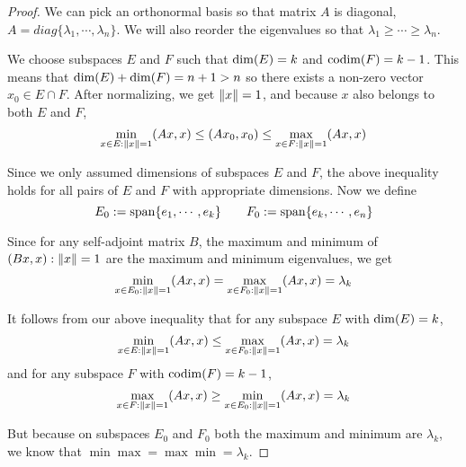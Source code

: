 \begin{proof}
We can pick an orthonormal basis so that matrix $A$ is diagonal, $A = diag\{ \lambda_{1}, \cdots, \lambda_{n} \}$. We will also reorder the eigenvalues so that $\lambda_{1} \geq \cdots \geq \lambda_{n}$.

We choose subspaces $E$ and $F$ such that $\operatorname{dim}(E) = k$ and $\operatorname{codim}(F) = k -1$. This means that $\operatorname{dim}(E) + \operatorname{dim}(F) = n + 1 > n$ so there exists a non-zero vector $x_{0} \in E \cap F$. After normalizing, we get $\norm{x} = 1$, and because $x$ also belongs to both $E$ and $F$, 
$$\min_{x \in E: \norm{x} = 1} (Ax, x) \leq (Ax_{0}, x_{0}) \leq \max_{x \in F: \norm{x} = 1} (Ax, x)$$

Since we only assumed dimensions of subspaces $E$ and $F$, the above inequality holds for all pairs of $E$ and $F$ with appropriate dimensions. Now we define 
$$E_{0} := \operatorname{span}\{e_{1}, \cdots, e_{k} \} \qquad F_{0} := \operatorname{span} \{e_{k}, \cdots, e_{n} \}$$ 

Since for any self-adjoint matrix $B$, the maximum and minimum of $(Bx, x) : \norm{x} = 1$ are the maximum and minimum eigenvalues, we get 
$$\min_{x \in E_{0} : \norm{x} = 1} (Ax, x) = \max_{x \in F_{0} : \norm{x} = 1} (Ax, x) = \lambda_{k}$$

It follows from our above inequality that for any subspace $E$ with $\operatorname{dim}(E) = k$, 
$$\min_{x \in E : \norm{x} = 1} (Ax, x) \leq \max_{x \in F_{0} : \norm{x} = 1} (Ax, x) = \lambda_{k}$$
and for any subspace $F$ with $\operatorname{codim}(F) = k - 1$, 
$$\max_{x \in F : \norm{x} = 1} (Ax, x) \geq \min_{x \in E_{0} : \norm{x} = 1} (Ax, x) = \lambda_{k}$$

But because on subspaces $E_{0}$ and $F_{0}$ both the maximum and minimum are $\lambda_{k}$, we know that $\min \max = \max \min = \lambda_{k}$. 
\end{proof}
